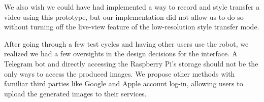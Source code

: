 We also wish we could have had implemented a way to record and style transfer a video using this prototype, but our implementation did not allow us to do so without turning off the live-view feature of the low-resolution style transfer mode.

After going through a few test cycles and having other users use the robot, we realized we had a few oversights in the design decisions for the interface. A Telegram bot and directly accessing the Raspberry Pi's storage should not be the only ways to access the produced images. We propose other methods with familiar third parties like Google and Apple account log-in, allowing users to upload the generated images to their services. 
